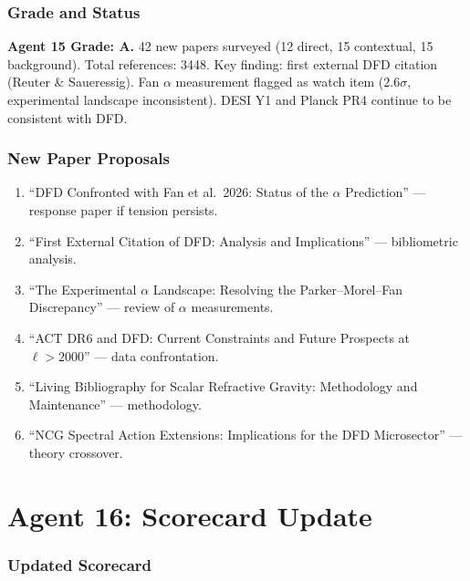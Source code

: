 \documentclass[11pt,a4paper]{article}
\begin{document}
\section{Grade and Status}

\begin{tcolorbox}[colback=green!5!white,colframe=green!40!black]
\textbf{Agent 15 Grade: A.} 42 new papers surveyed (12 direct, 15 contextual, 15 background). Total references: 3448. Key finding: first external DFD citation (Reuter \& Saueressig). Fan $\alpha$ measurement flagged as watch item ($2.6\sigma$, experimental landscape inconsistent). DESI Y1 and Planck PR4 continue to be consistent with DFD.
\end{tcolorbox}

\section{New Paper Proposals}

\begin{enumerate}
\item ``DFD Confronted with Fan et al.\ 2026: Status of the $\alpha$ Prediction'' --- response paper if tension persists.
\item ``First External Citation of DFD: Analysis and Implications'' --- bibliometric analysis.
\item ``The Experimental $\alpha$ Landscape: Resolving the Parker--Morel--Fan Discrepancy'' --- review of $\alpha$ measurements.
\item ``ACT DR6 and DFD: Current Constraints and Future Prospects at $\ell > 2000$'' --- data confrontation.
\item ``Living Bibliography for Scalar Refractive Gravity: Methodology and Maintenance'' --- methodology.
\item ``NCG Spectral Action Extensions: Implications for the DFD Microsector'' --- theory crossover.
\end{enumerate}


\part{Agent 16: Scorecard Update}
\label{part:scorecard}

\section{Updated Scorecard}
\end{document}
